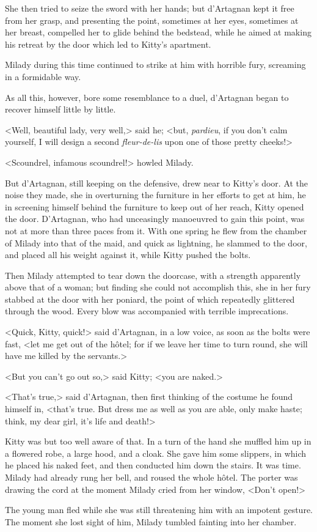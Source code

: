She then tried to seize the sword with her hands; but d'Artagnan kept it free from her grasp, and presenting the point, sometimes at her eyes, sometimes at her breast, compelled her to glide behind the bedstead, while he aimed at making his retreat by the door which led to Kitty's apartment. 

Milady during this time continued to strike at him with horrible fury, screaming in a formidable way. 

As all this, however, bore some resemblance to a duel, d'Artagnan began to recover himself little by little. 

<Well, beautiful lady, very well,> said he; <but, \textit{pardieu}, if you don't calm yourself, I will design a second \textit{fleur-de-lis} upon one of those pretty cheeks!> 

<Scoundrel, infamous scoundrel!> howled Milady. 

But d'Artagnan, still keeping on the defensive, drew near to Kitty's door. At the noise they made, she in overturning the furniture in her efforts to get at him, he in screening himself behind the furniture to keep out of her reach, Kitty opened the door. D'Artagnan, who had unceasingly manoeuvred to gain this point, was not at more than three paces from it. With one spring he flew from the chamber of Milady into that of the maid, and quick as lightning, he slammed to the door, and placed all his weight against it, while Kitty pushed the bolts. 

Then Milady attempted to tear down the doorcase, with a strength apparently above that of a woman; but finding she could not accomplish this, she in her fury stabbed at the door with her poniard, the point of which repeatedly glittered through the wood. Every blow was accompanied with terrible imprecations. 

<Quick, Kitty, quick!> said d'Artagnan, in a low voice, as soon as the bolts were fast, <let me get out of the hôtel; for if we leave her time to turn round, she will have me killed by the servants.> 

<But you can't go out so,> said Kitty; <you are naked.> 

<That's true,> said d'Artagnan, then first thinking of the costume he found himself in, <that's true. But dress me as well as you are able, only make haste; think, my dear girl, it's life and death!> 

Kitty was but too well aware of that. In a turn of the hand she muffled him up in a flowered robe, a large hood, and a cloak. She gave him some slippers, in which he placed his naked feet, and then conducted him down the stairs. It was time. Milady had already rung her bell, and roused the whole hôtel. The porter was drawing the cord at the moment Milady cried from her window, <Don't open!> 

The young man fled while she was still threatening him with an impotent gesture. The moment she lost sight of him, Milady tumbled fainting into her chamber. 